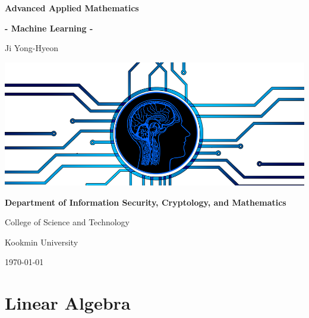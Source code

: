 \documentclass[12pt,openany]{book}
\theoremstyle{definition}
\begin{document}
	
	\begin{titlepage}
		\begin{center}
			{\Huge\textsf{\textbf{Advanced Applied Mathematics}}\par}
			{\LARGE\textsf{\textbf{- Machine Learning -}}\par}
			\vspace{0.5in}
			{\Large Ji Yong-Hyeon\par}
			\vspace{1in}\centering
			\includegraphics[width=\textwidth,height=.3\textheight]{aam.png}\par
			\vspace{1in}\large
			{\bfseries Department of Information Security, Cryptology, and Mathematics\par}
			{College of Science and Technology\par}
			{Kookmin University\par}
			\vspace{.25in}
			{\large \today\par}
		\end{center}
	\end{titlepage}
	
	\tableofcontents
	
	\mainmatter
	
	\chapter{Linear Algebra}
\end{document}
